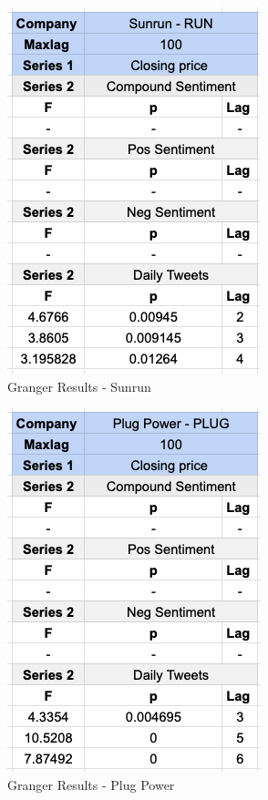 \documentclass[sigconf, nonacm]{acmart}
\begin{document}
\begin{figure}[H]
  \centering
  \includegraphics[width=0.7\linewidth]{granger_results/granger_sunrun.png}
  \caption{Granger Results - Sunrun}
  \label{granger_sunrun}
\end{figure}

\begin{figure}[H]
  \centering
  \includegraphics[width=0.7\linewidth]{granger_results/granger_plug.png}
  \caption{Granger Results - Plug Power}
  \label{granger_plug}
\end{figure}
\end{document}
